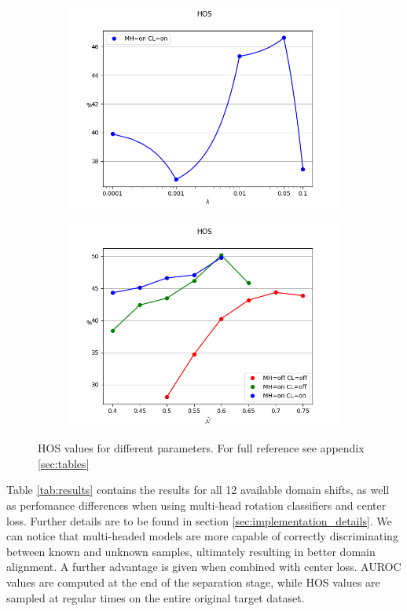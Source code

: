 \documentclass[10pt,twocolumn,letterpaper]{article}
\begin{document}
\begin{figure}[!htb]
\begin{subfigure}[!htb]{0.35\textwidth}
    \includegraphics[trim=0 0 0 2cm, clip, width=\linewidth]{hos-l.png}
  \end{subfigure}
  \begin{subfigure}[!htb]{0.35\textwidth}
    \includegraphics[trim=0 0 0 2cm, clip, width=\linewidth]{hos-th.png}
  \end{subfigure}
  \caption{\centering\label{figurelabel} HOS values for different parameters. For full reference see appendix \ref{sec:tables}}
\end{figure}

Table \ref{tab:results} contains the results for all 12 available domain shifts,
as well as perfomance differences when using multi-head rotation classifiers and center loss.
Further details are to be found in section \ref{sec:implementation_details}.
We can notice that multi-headed models are more capable of correctly discriminating between known and unknown samples,
ultimately resulting in better domain alignment.
A further advantage is given when combined with center loss.
AUROC values are computed at the end of the separation stage, 
while HOS values are sampled at regular times on the entire original target dataset.
\end{document}
